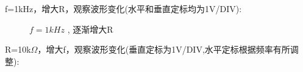 \documentclass[UTF8]{ctexart}
\begin{document}
f=1kHz，增大R，观察波形变化(水平和垂直定标均为1V/DIV):
\begin{figure}[htbp]
    \centering
    \quad   
    \caption{$f=1kHz$ , 逐渐增大R}
    \label{fig.1}
\end{figure}

R=10k$\Omega$，增大f，观察波形变化(垂直定标为1V/DIV,水平定标根据频率有所调整):
\end{document}
